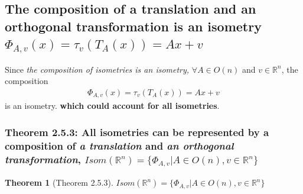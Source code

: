 \documentclass[11pt,a4paper]{article}
\newtheorem{theorem}{Theorem}
\begin{document}
\subsection{The composition of a translation and an orthogonal transformation is an isometry $\Phi_{A,v}(x)=\tau_v(T_A(x))=Ax+v$}
Since \textit{the composition of isometries is an isometry,} $\forall A\in O(n)$ and $v\in \mathbb{R}^n$, the composition
\begin{equation}
    \begin{aligned}
        \Phi_{A,v}(x)=\tau_v(T_A(x))=Ax+v
    \end{aligned}
    \nonumber
\end{equation}
is an isometry. \textbf{which could account for all isometries}.
\subsubsection{Theorem 2.5.3: All isometries can be represented by a composition of \textit{a translation} and \textit{an orthogonal transformation}, $Isom(\mathbb{R}^n)=\{\Phi_{A,v}|A\in O(n), v\in \mathbb{R}^n \}$}
\begin{theorem}[Theorem 2.5.3]
$Isom(\mathbb{R}^n)=\{\Phi_{A,v}|A\in O(n), v\in \mathbb{R}^n \}$
\end{theorem}
\end{document}
